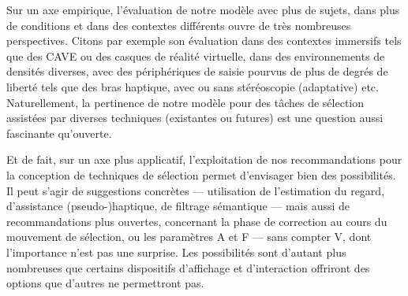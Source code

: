 	Sur un axe empirique, l'évaluation de notre modèle avec plus de sujets, dans plus de conditions et dans des contextes différents ouvre de très nombreuses perspectives. Citons par exemple son évaluation dans des contextes immersifs tels que des CAVE ou des casques de réalité virtuelle, dans des environnements de densités diverses, avec des périphériques de saisie pourvus de plus de degrés de liberté tels que des bras haptique, avec ou sans stéréoscopie (adaptative) etc. Naturellement, la pertinence de notre modèle pour des tâches de sélection assistées par diverses techniques (existantes ou futures) est une question aussi fascinante qu'ouverte.
	
	Et de fait, sur un axe plus applicatif, l'exploitation de nos recommandations pour la conception de techniques de sélection permet d'envisager bien des possibilités. Il peut s'agir de suggestions concrètes --- utilisation de l'estimation du regard, d'assistance (pseudo-)haptique, de filtrage sémantique --- mais aussi de recommandations plus ouvertes, concernant la phase de correction au cours du mouvement de sélection, ou les paramètres A et F --- sans compter V, dont l'importance n'est pas une surprise. Les possibilités sont d'autant plus nombreuses que certains dispositifs d'affichage et d'interaction offriront des options que d'autres ne permettront pas.
	
	